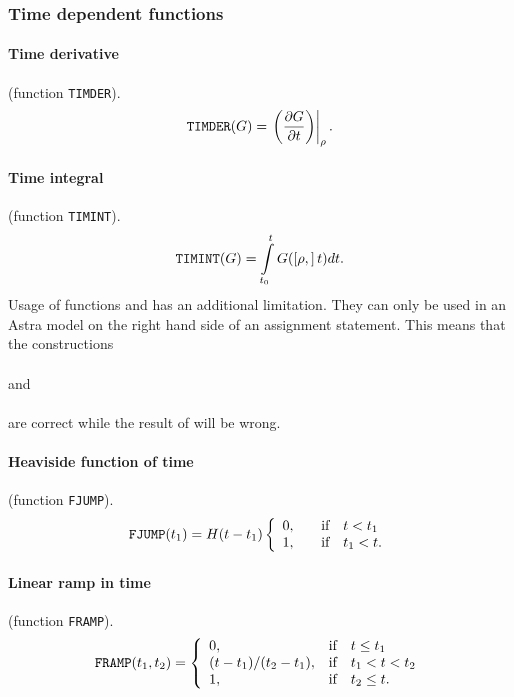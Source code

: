 \subsubsection{Time dependent functions}

\paragraph{Time derivative} (function {\tt TIMDER}).
$$
{\tt TIMDER}(G)=\left.\left(\displaystyle{\partial G\over\partial t}\right)\right|_\rho
.$$

\paragraph{Time integral} (function {\tt TIMINT}).
$$
{\tt TIMINT}(G)=\int\limits_{t_0}^t G([\rho,]\,t)dt
.$$
Usage of functions  and  has an additional
limitation. 
They can only be used in an Astra model on the right hand side of an
assignment statement. 
This means that the constructions 
\\ \indent
{}
\\
and
\\ \indent
{}
\\
are correct while the result of 
will be wrong.

\paragraph{Heaviside function of time} (function {\tt FJUMP}).
$$
{\tt FJUMP}(t_1)=H(t-t_1)
\left\{\begin{array}{ll}
0
,\quad &
\mbox{if}\quad t<t_1\\
1
,&
\mbox{if}\quad t_1<t
.\\
\end{array}\right.
$$

\paragraph{Linear ramp in time} (function {\tt FRAMP}).
$$
{\tt FRAMP}(t_1,t_2)=
\left\{\begin{array}{ll}
0
,\quad &
\mbox{if}\quad t\leq t_1\\
(t-t_1)/(t_2-t_1)
,&
\mbox{if}\quad t_1< t< t_2\\
1
,&
\mbox{if}\quad t_2\leq t
.\\
\end{array}\right.
$$

